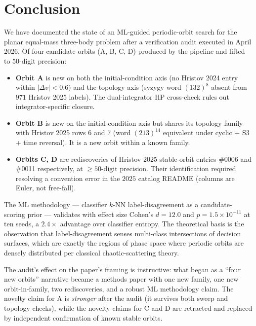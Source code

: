 \documentclass[11pt]{article}
\begin{document}
\section{Conclusion}
\label{sec:conclusion}

We have documented the state of an ML-guided periodic-orbit search
for the planar equal-mass three-body problem after a verification
audit executed in April 2026. Of four candidate orbits (A, B, C, D)
produced by the pipeline and lifted to $50$-digit precision:

\begin{itemize}[leftmargin=1.5em]
  \item \textbf{Orbit A} is new on both the initial-condition axis
    (no Hristov 2024 entry within $|\Delta v|<0.6$) and the topology
    axis (syzygy word $(132)^8$ absent from $971$ Hristov 2025
    labels). The dual-integrator HP cross-check rules out
    integrator-specific closure.
  \item \textbf{Orbit B} is new on the initial-condition axis but
    shares its topology family with Hristov 2025 rows $6$ and $7$
    (word $(213)^{14}$ equivalent under cyclic + S3 + time reversal).
    It is a new orbit within a known family.
  \item \textbf{Orbits C, D} are rediscoveries of Hristov $2025$
    stable-orbit entries \#0006 and \#0011 respectively, at
    $\ge\!50$-digit precision. Their identification required
    resolving a convention error in the $2025$ catalog README
    (columns are Euler, not free-fall).
\end{itemize}

The ML methodology --- classifier $k$-NN label-disagreement as a
candidate-scoring prior --- validates with effect size Cohen's
$d=12.0$ and $p=1.5\!\times\!10^{-11}$ at ten seeds, a $2.4\times$
advantage over classifier entropy. The theoretical basis is the
observation that label-disagreement senses multi-class intersections
of decision surfaces, which are exactly the regions of phase space
where periodic orbits are densely distributed per classical
chaotic-scattering theory.

The audit's effect on the paper's framing is instructive: what began
as a ``four new orbits'' narrative became a methods paper with one
new family, one new orbit-in-family, two rediscoveries, and a
robust ML methodology claim. The novelty claim for A is
\emph{stronger} after the audit (it survives both sweep and
topology checks), while the novelty claims for C and D are
retracted and replaced by independent confirmation of known stable
orbits.
\end{document}

